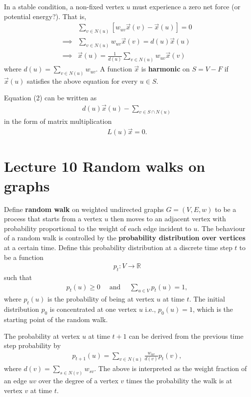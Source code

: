 \documentclass[]{article}
\begin{document}
	In a stable condition, a non-fixed vertex $u$ must experience a zero net force (or potential energy?). That is, 
	\begin{align}
	&\sum_{v \in N(u)} \left[w_{uv}\vec{x}(v) - \vec{x}(u)\right] = 0 \nonumber \\
	\implies &\sum_{v \in N(u)} w_{uv}\vec{x}(v) = d(u)\vec{x}(u) \\
	\implies &\vec{x}(u) = \frac{1}{d(u)}\sum_{v \in N(u)} w_{uv}\vec{x}(v) \nonumber
	\end{align}
	where $d(u)=\sum_{v \in N(u)} w_{uv}$. A function $\vec{x}$ is \textbf{harmonic} on $S=V-F$ if $\vec{x}(u)$ satisfies the above equation for every $u \in S$.
	
	Equation (2) can be written as 
	\begin{align*}
	d(u)\vec{x}(u) - \sum_{v \in S \cap N(u)} 
	\end{align*}
	in the form of matrix multiplication 
	\begin{align*}
	L(u)\vec{x} = 0.
	\end{align*}
	
	
\section{Lecture 10 Random walks on graphs}

Define \textbf{random walk} on weighted undirected graphs $G=(V,E,w)$ to be a process that starts from a vertex $u$ then moves to an adjacent vertex with probability proportional to the weight of each edge incident to $u$. The behaviour of a random walk is controlled by the \textbf{probability distribution over vertices} at a certain time. Define this probability distribution at a discrete time step $t$ to be a function 
\begin{align*}
	p_t: V \rightarrow \mathbb{R}
\end{align*}
such that 
\begin{align*}
	p_t(u) \ge 0 \quad \text{ and } \quad \sum_{u \in V} p_t(u)=1,
\end{align*}
where $p_t(u)$ is the probability of being at vertex $u$ at time $t$. The initial distribution $p_0$ is concentrated at one vertex $u$ i.e., $p_0(u)=1$, which is the starting point of the random walk. 
	
The probability at vertex $u$ at time $t+1$ can be derived from the previous time step probability by 
\begin{align*}
	p_{t+1}(u) = \sum_{v \in N(u)}\frac{w_{uv}}{d(v)}p_t(v),
\end{align*}
where $d(v)=\sum_{s \in N(v)} w_{sv}$. The above is interpreted as the weight fraction of an edge $uv$ over the degree of a vertex $v$ times the probability the walk is at vertex $v$ at time $t$. 
\end{document}
